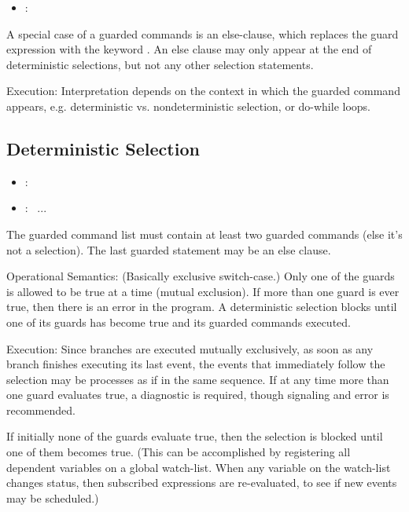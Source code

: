 \begin{itemize}
\item {} :  \prsrarrow\ 
\end{itemize}

A special case of a guarded commands is an else-clause, 
which replaces the guard expression with the keyword .  
An else clause may only appear at the end of deterministic selections, 
but not any other selection statements.  

Execution: 
Interpretation depends on the context in which the guarded command appears, 
e.g. deterministic vs. nondeterministic selection, or do-while loops.  

\subsection{Deterministic Selection}
\label{sec:chp:flow:detsel}

\begin{itemize}
\item {} :
	\lbracket\  \rbracket
\item {} :
	 \thickbar\ ...
\end{itemize}

The guarded command list must contain at least two guarded commands
(else it's not a selection).  
The last guarded statement may be an else clause.  

Operational Semantics: 
(Basically exclusive switch-case.)
Only one of the guards is allowed to be true at a time (mutual exclusion).  
If more than one guard is ever true, then there is an error in the program.  
A deterministic selection blocks until one of its guards has become true
and its guarded commands executed.  

Execution: 
Since branches are executed mutually exclusively, as soon as any branch
finishes executing its last event, the events that immediately follow 
the selection may be processes as if in the same sequence.  
If at any time more than one guard evaluates true, a diagnostic is
required, though signaling and error is recommended.  

If initially none of the guards evaluate true, 
then the selection is blocked until one of them becomes true.  
(This can be accomplished by registering all dependent variables
on a global watch-list.  
When any variable on the watch-list changes status, then subscribed
expressions are re-evaluated, to see if new events may be scheduled.)

